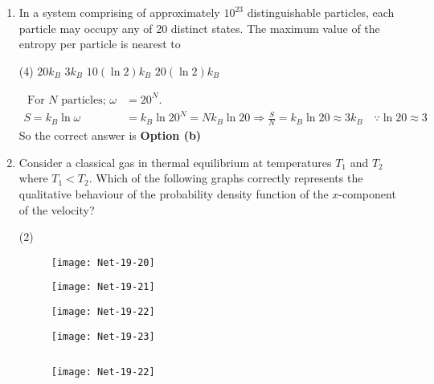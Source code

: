 \begin{enumerate}
\begin{answer}
\end{answer}
\item In a system comprising of approximately $10^{23}$ distinguishable particles, each particle may occupy any of 20 distinct states. The maximum value of the entropy per particle is nearest to
 \begin{tasks}(4)
	\task[\textbf{a.}] $20 k_{B}$
	\task[\textbf{b.}]$3 k_{B}$
	\task[\textbf{c.}]$10(\ln 2) k_{B}$
	\task[\textbf{d.}]$20(\ln 2) k_{B}$ 
\end{tasks}
\begin{answer}
	\begin{align*}
	\text { For } N \text { particles; } \omega&=20^{N} \text {. }\\
	S=k_{B} \ln \omega&=k_{B} \ln 20^{N}=N k_{B} \ln 20 \Rightarrow \frac{S}{N}=k_{B} \ln 20 \approx 3 k_{B} \quad \because \ln 20 \approx 3
	\end{align*}
		So the correct answer is \textbf{Option (b)}
\end{answer}
\item  Consider a classical gas in thermal equilibrium at temperatures $T_{1}$ and $T_{2}$ where $T_{1}<T_{2}$. Which of the following graphs correctly represents the qualitative behaviour of the probability density function of the $x$-component of the velocity?
 \begin{tasks}(2)
	\task[\textbf{a.}]
	\begin{figure}[H]
		\centering
		\texttt{[image: Net-19-20]}
	\end{figure}
	\task[\textbf{b.}]
		\begin{figure}[H]
		\centering
		\texttt{[image: Net-19-21]}
	\end{figure}
	\task[\textbf{c.}]
		\begin{figure}[H]
		\centering
		\texttt{[image: Net-19-22]}
	\end{figure}
	\task[\textbf{d.}] 
		\begin{figure}[H]
		\centering
		\texttt{[image: Net-19-23]}
	\end{figure}
\end{tasks}
\begin{answer}$\left. \right. $\\
	\begin{figure}[H]
		\centering
		\texttt{[image: Net-19-22]}
	\end{figure}
	\begin{align*}

\end{align*}
\end{answer}
\end{enumerate}
